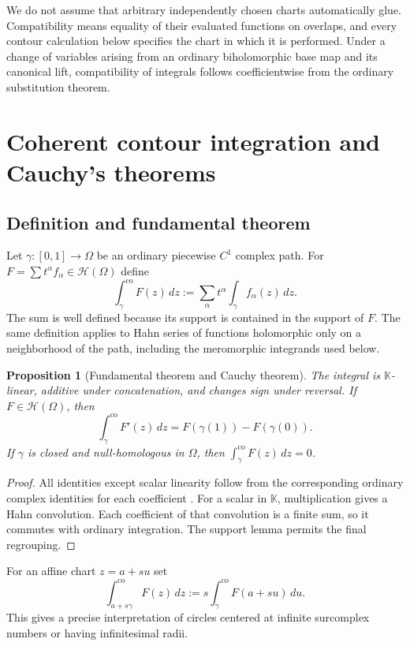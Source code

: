 \documentclass[11pt,a4paper]{article}
\numberwithin{equation}{section}
\newtheorem{proposition}[theorem]{Proposition}
\theoremstyle{definition}
\theoremstyle{remark}
\newcommand{\K}{\mathbb K}
\newcommand{\HH}{\mathscr H}
\newcommand{\co}{\mathrm{co}}
\begin{document}
We do not assume that arbitrary independently chosen charts automatically glue. Compatibility means equality of their evaluated functions on overlaps, and every contour calculation below specifies the chart in which it is performed. Under a change of variables arising from an ordinary biholomorphic base map and its canonical lift, compatibility of integrals follows coefficientwise from the ordinary substitution theorem.

\section{Coherent contour integration and Cauchy's theorems}
\label{sec:contours}
\subsection{Definition and fundamental theorem}
Let $\gamma:[0,1]\to\Omega$ be an ordinary piecewise $C^1$ complex path. For $F=\sum t^\alpha f_\alpha\in\HH(\Omega)$ define
\begin{equation}
\label{eq:integral}
 \int_\gamma^{\co}F(z)\,dz
 :=\sum_\alpha t^\alpha\int_\gamma f_\alpha(z)\,dz.
\end{equation}
The sum is well defined because its support is contained in the support of $F$. The same definition applies to Hahn series of functions holomorphic only on a neighborhood of the path, including the meromorphic integrands used below.

\begin{proposition}[Fundamental theorem and Cauchy theorem]
\label{prop:FTOC}
The integral is $\K$-linear, additive under concatenation, and changes sign under reversal. If $F\in\HH(\Omega)$, then
\[
 \int_\gamma^{\co}F'(z)\,dz=F(\gamma(1))-F(\gamma(0)).
\]
If $\gamma$ is closed and null-homologous in $\Omega$, then
$\int_\gamma^{\co}F(z)\,dz=0$.
\end{proposition}
\begin{proof}
All identities except scalar linearity follow from the corresponding ordinary complex identities for each coefficient \cite{Ahlfors}. For a scalar in $\K$, multiplication gives a Hahn convolution. Each coefficient of that convolution is a finite sum, so it commutes with ordinary integration. The support lemma permits the final regrouping.
\end{proof}
For an affine chart $z=a+su$ set
\[
 \int_{a+s\gamma}^{\co} F(z)\,dz
 :=s\int_\gamma^{\co}F(a+su)\,du.
\]
This gives a precise interpretation of circles centered at infinite surcomplex numbers or having infinitesimal radii.
\end{document}

